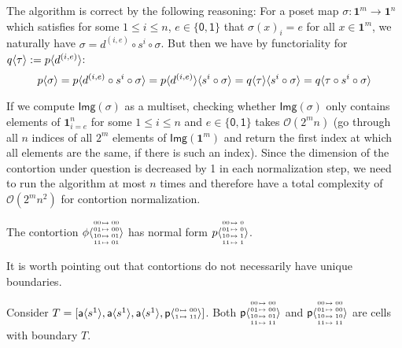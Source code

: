 \documentclass{llncs}
\makeatletter
\newcommand{\continuation}{??}
\newenvironment{examplecontd}[1]
{
  \renewcommand{\continuation}{\ref{#1}}\expcont[continued]
}
{\endexpcont}
\newcommand{\mdef}{:=}
\newcommand{\mlist}[1]{[ {#1} ]}
\newcommand{\pint}[1]{\mathbf{1}^{#1}}
\newcommand{\pintrestr}[3]{\mathbf{1}^{#1}_{{#2}={#3}}}
\newcommand{\izero}{\mathsf{0}}
\newcommand{\ione}{\mathsf{1}}
\newcommand{\image}[1]{\textsf{Img}({#1})}
\newcommand{\smap}[1]{s^{{#1}}}
\newcommand{\dmap}[2]{d^{({#1} , {#2})}}
\newcommand{\cont}[2]{\ensuremath{ \ifthenelse{\equal{#2}{}}{#1}{{#1}\langle{#2}\rangle}} }
\newcommand{\cset}[1]{\ensuremath{\mathsf{{#1}}}}
\newcommand{\substtwo}[2]{\tiny
  \arraycolsep=.4pt\def\arraystretch{1}
  \begin{array}{ll}
    0 &\mapsto {#1} \\
    1 &\mapsto {#2}
  \end{array}
}
\newcommand{\substfour}[4]{\tiny
  \arraycolsep=.4pt\def\arraystretch{1}
  \begin{array}{ll}
    00 &\mapsto {#1} \\
    01 &\mapsto {#2} \\
    10 &\mapsto {#3} \\
    11 &\mapsto {#4} 
  \end{array}
}
\makeatother
\begin{document}
The algorithm is correct by the following reasoning: For a poset map $\sigma :
\pint{m} \to \pint{n}$ which satisfies for some $1 \leq i \leq n$, $e \in
\{\izero, \ione\}$ that $\sigma(x)_i = e$ for all $x \in \pint{m}$, we naturally
have $\sigma = \dmap{i}{e} \circ \smap{i} \circ \sigma$.
But then we have by functoriality for $\cont{q}{\tau} \mdef \cont{p}{\dmap{i}{e}}$:
$$\cont{p}{\sigma} = \cont{p}{\dmap{i}{e} \circ \smap{i} \circ \sigma} =
\cont{\cont{p}{\dmap{i}{e}}}{\smap{i} \circ \sigma} =
\cont{\cont{q}{\tau}}{\smap{i} \circ \sigma} = \cont{q}{\tau \circ \smap{i} \circ \sigma}$$



If we compute $\image{\sigma}$ as a multiset, checking whether 
$\image{\sigma}$ only contains elements of $\pintrestr{n}{i}{e}$ for
some $1 \leq i \leq n$ and $e \in \{\izero,\ione\}$ takes $\mathcal{O}(2^mn)$
(go through all $n$ indices of all $2^m$ elements of $\image{\pint{m}}$ and
return the first index at which all elements are the same, if there is such an index).
Since the dimension of the contortion under question is decreased by 1 in each
normalization step, we need to run the algorithm at most $n$ times and therefore
have a total complexity of $\mathcal{O}(2^mn^2)$ for contortion normalization.

\begin{examplecontd}{exp:triangle}
  The contortion $\cont{\phi}{\substfour{00}{00}{01}{01}}$ has normal form $\cont{p}{\substfour{0}{0}{1}{1}}$.
\end{examplecontd}

It is worth pointing out that contortions do not necessarily have unique boundaries.

\begin{examplecontd}{exp:sndsphere}
  Consider $T = \mlist{ \cont{\cset{a}}{\smap{1}} , \cont{\cset{a}}{\smap{1}}
    , \cont{\cset{a}}{\smap{1}} , \cont{\cset{p}}{\substtwo{00}{11}} }$.
  Both $\cont{\cset{p}}{\substfour{00}{00}{01}{11}}$ and
  $\cont{\cset{p}}{\substfour{00}{00}{10}{11}}$ are cells with boundary $T$.
\end{examplecontd}
\end{document}
